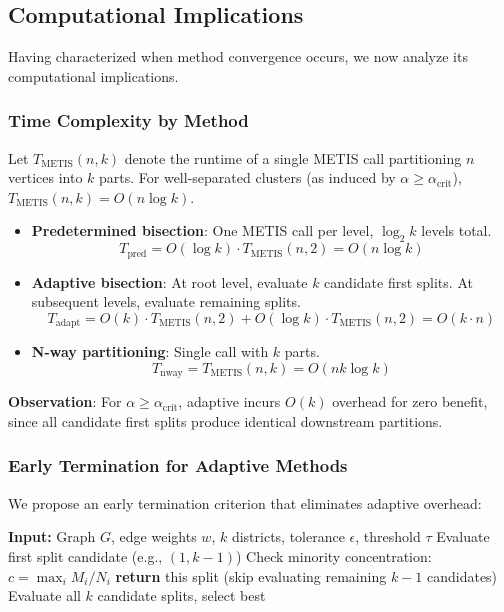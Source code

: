 \subsection{Computational Implications}

Having characterized when method convergence occurs, we now analyze its computational implications.

\subsubsection{Time Complexity by Method}

Let $T_{\text{METIS}}(n, k)$ denote the runtime of a single METIS call partitioning $n$ vertices into $k$ parts. For well-separated clusters (as induced by $\alpha \geq \alpha_{\text{crit}}$), $T_{\text{METIS}}(n, k) = O(n \log k)$.

\begin{itemize}
    \item \textbf{Predetermined bisection}: One METIS call per level, $\log_2 k$ levels total.
    \[
    T_{\text{pred}} = O(\log k) \cdot T_{\text{METIS}}(n, 2) = O(n \log k)
    \]

    \item \textbf{Adaptive bisection}: At root level, evaluate $k$ candidate first splits. At subsequent levels, evaluate remaining splits.
    \[
    T_{\text{adapt}} = O(k) \cdot T_{\text{METIS}}(n, 2) + O(\log k) \cdot T_{\text{METIS}}(n, 2) = O(k \cdot n)
    \]

    \item \textbf{N-way partitioning}: Single call with $k$ parts.
    \[
    T_{\text{nway}} = T_{\text{METIS}}(n, k) = O(n k \log k)
    \]
\end{itemize}

\textbf{Observation}: For $\alpha \geq \alpha_{\text{crit}}$, adaptive incurs $O(k)$ overhead for zero benefit, since all candidate first splits produce identical downstream partitions.

\subsubsection{Early Termination for Adaptive Methods}

We propose an early termination criterion that eliminates adaptive overhead:

\begin{algorithm}[H]
\caption{Adaptive Bisection with Early Termination}
\begin{algorithmic}[1]
\STATE \textbf{Input:} Graph $G$, edge weights $w$, $k$ districts, tolerance $\epsilon$, threshold $\tau$
\STATE Evaluate first split candidate (e.g., $(1, k-1)$)
\STATE Check minority concentration: $c = \max_{i} M_i / N_i$
    \STATE \textbf{return} this split (skip evaluating remaining $k-1$ candidates)
\ELSE
    \STATE Evaluate all $k$ candidate splits, select best
\ENDIF
\end{algorithmic}
\end{algorithm}

